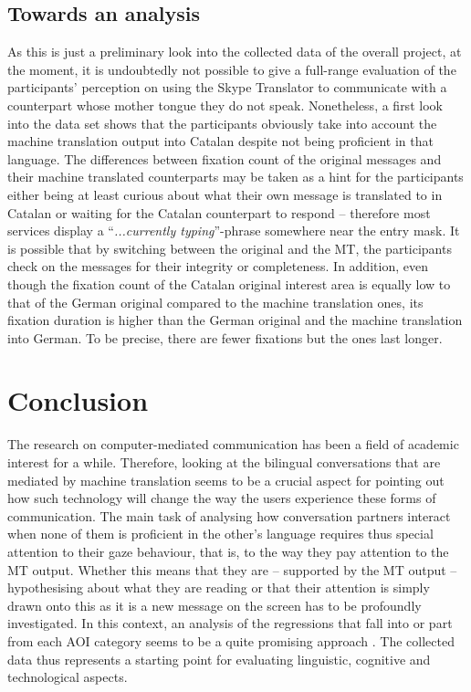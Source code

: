 \documentclass[output=paper]{langscibook}
\begin{document}

\subsection{Towards an analysis}
\label{subsec:towards_analysis}

As this is just a preliminary look into the collected data of the overall project, at the moment, it is undoubtedly not possible to give a full-range evaluation of the participants' perception on using the Skype Translator to communicate with a counterpart whose mother tongue they do not speak. Nonetheless, a first look into the data set shows that the participants obviously take into account the machine translation output into Catalan despite not being proficient in that language. The differences between fixation count of the original messages and their machine translated counterparts may be taken as a hint for the participants either being at least curious about what their own message is translated to in Catalan or waiting for the Catalan counterpart to respond -- therefore most services display a ``\textit{...currently typing}''-phrase somewhere near the entry mask.
It is possible that by switching between the original and the MT, the participants check on the messages for their integrity or completeness. In addition, even though the fixation count of the Catalan original interest area is equally low to that of the German original compared to the machine translation ones, its fixation duration is higher than the German original and the machine translation into German. To be precise, there are fewer fixations but the ones last longer.
 




\section{Conclusion}
\label{sec:conclusion}

The research on computer-mediated communication has been a field of academic interest for a while. Therefore, looking at the bilingual conversations that are mediated by machine translation seems to be a crucial aspect for pointing out how such technology will change the way the users experience these forms of communication. The main task of analysing how conversation partners interact when none of them is proficient in the other's language requires thus special attention to their gaze behaviour, that is, to the way they pay attention to the MT output. Whether this means that they are -- supported by the MT output -- hypothesising about what they are reading or that their attention is simply drawn onto this as it is a new message on the screen has to be profoundly investigated. In this context, an analysis of the regressions that fall into or part from each AOI category seems to be a quite promising approach \citep[cf.][]{eskenazi_regressions_2017}. The collected data thus represents a starting point for evaluating linguistic, cognitive and technological aspects.    
\end{document}

